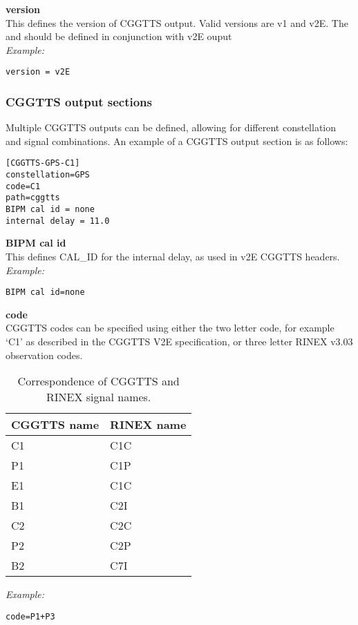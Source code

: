 {\bfseries version}\\
This defines the version of CGGTTS output. Valid versions are v1 and v2E. 
The  and  should be defined in conjunction with v2E ouput\\
\textit{Example:}
\begin{lstlisting}
version = v2E
\end{lstlisting}




\subsubsection{CGGTTS output sections}

Multiple CGGTTS outputs can be defined, allowing for different constellation and signal combinations.
An example of a CGGTTS output section is as follows:
\begin{lstlisting}
[CGGTTS-GPS-C1]
constellation=GPS
code=C1
path=cggtts
BIPM cal id = none
internal delay = 11.0
\end{lstlisting}

{\bfseries BIPM cal id}\\
This defines CAL\_ID for the internal delay, as used in v2E CGGTTS headers.\\
\textit{Example:}
\begin{lstlisting}
BIPM cal id=none
\end{lstlisting}

{\bfseries code}\\

CGGTTS codes can be specified using either the two letter code, for example `C1' as described in the CGGTTS V2E 
specification, or three letter RINEX v3.03 observation codes.
\begin{table}
\begin{tabular}{ll}
	CGGTTS name	 & RINEX name \\ \hline
	C1 & C1C \\
	P1 & C1P \\
	E1 & C1C \\
	B1 & C2I \\
	C2 & C2C \\
	P2 & C2P \\
	B2 & C7I 
\end{tabular}
\caption{Correspondence of CGGTTS and RINEX signal names.}
\end{table}
\textit{Example:}
\begin{lstlisting}
code=P1+P3
\end{lstlisting}

